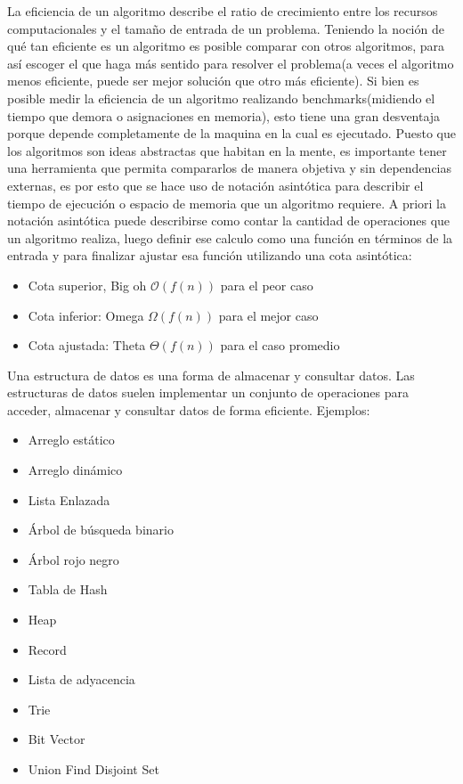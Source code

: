 \documentclass[12pt]{article}
\begin{document}

La eficiencia de un algoritmo describe el ratio de crecimiento entre los recursos computacionales y el tamaño de entrada de un problema. Teniendo la noción de qué tan eficiente es un algoritmo es posible comparar con otros algoritmos, para así escoger el que haga más sentido para resolver el problema(a veces el algoritmo menos eficiente, puede ser mejor solución que otro más eficiente). Si bien es posible medir la eficiencia de un algoritmo realizando benchmarks(midiendo el tiempo que demora o asignaciones en memoria), esto tiene una gran desventaja porque depende completamente de la maquina en la cual es ejecutado. Puesto que los algoritmos son ideas abstractas que habitan en la mente, es importante tener una herramienta que permita compararlos de manera objetiva y sin dependencias externas, es por esto que se hace uso de notación asintótica para describir el tiempo de ejecución o espacio de memoria que un algoritmo requiere. \newline \newline \newline
A priori la notación asintótica puede describirse como contar la cantidad de operaciones que un algoritmo realiza, luego definir ese calculo como una función en términos de la entrada y para finalizar ajustar esa función utilizando una cota asintótica:
\begin{itemize}
    \item Cota superior, Big oh $\mathcal{O}(f(n))$ para el peor caso 
    \item Cota inferior: Omega $\Omega (f(n))$ para el mejor caso
    \item Cota ajustada: Theta $\Theta(f(n))$ para el caso promedio
\end{itemize}

Una estructura de datos es una forma de almacenar y consultar datos. Las estructuras de datos suelen implementar un conjunto de operaciones para acceder, almacenar y consultar datos de forma eficiente.
\newline
Ejemplos:
\begin{itemize}
    \item Arreglo estático
    \item Arreglo dinámico
    \item Lista Enlazada
    \item Árbol de búsqueda binario
    \item Árbol rojo negro
    \item Tabla de Hash
    \item Heap
    \item Record
    \item Lista de adyacencia
    \item Trie
    \item Bit Vector
    \item Union Find Disjoint Set
\end{itemize}
\end{document}
